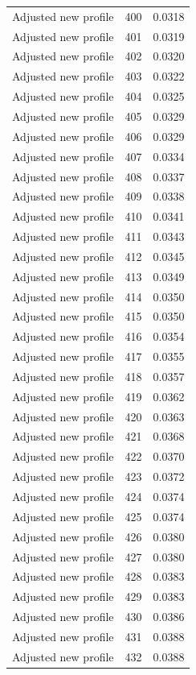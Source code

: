 \begin{table}[htbp]
\begin{tabular}{lll}
Adjusted new profile & 400 & 0.0318 \\
Adjusted new profile & 401 & 0.0319 \\
Adjusted new profile & 402 & 0.0320 \\
Adjusted new profile & 403 & 0.0322 \\
Adjusted new profile & 404 & 0.0325 \\
Adjusted new profile & 405 & 0.0329 \\
Adjusted new profile & 406 & 0.0329 \\
Adjusted new profile & 407 & 0.0334 \\
Adjusted new profile & 408 & 0.0337 \\
Adjusted new profile & 409 & 0.0338 \\
Adjusted new profile & 410 & 0.0341 \\
Adjusted new profile & 411 & 0.0343 \\
Adjusted new profile & 412 & 0.0345 \\
Adjusted new profile & 413 & 0.0349 \\
Adjusted new profile & 414 & 0.0350 \\
Adjusted new profile & 415 & 0.0350 \\
Adjusted new profile & 416 & 0.0354 \\
Adjusted new profile & 417 & 0.0355 \\
Adjusted new profile & 418 & 0.0357 \\
Adjusted new profile & 419 & 0.0362 \\
Adjusted new profile & 420 & 0.0363 \\
Adjusted new profile & 421 & 0.0368 \\
Adjusted new profile & 422 & 0.0370 \\
Adjusted new profile & 423 & 0.0372 \\
Adjusted new profile & 424 & 0.0374 \\
Adjusted new profile & 425 & 0.0374 \\
Adjusted new profile & 426 & 0.0380 \\
Adjusted new profile & 427 & 0.0380 \\
Adjusted new profile & 428 & 0.0383 \\
Adjusted new profile & 429 & 0.0383 \\
Adjusted new profile & 430 & 0.0386 \\
Adjusted new profile & 431 & 0.0388 \\
Adjusted new profile & 432 & 0.0388 \\

\end{tabular}
\end{table}
